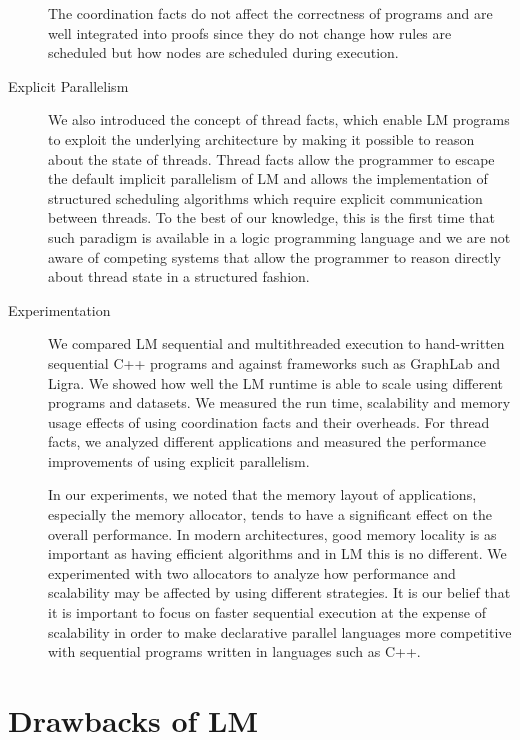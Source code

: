 \begin{description}
The coordination facts do not affect the correctness of programs and are well
integrated into proofs since they do not change how rules are scheduled but how
nodes are scheduled during execution.

\item[Explicit Parallelism]

We also introduced the concept of thread facts, which enable LM programs to
exploit the underlying architecture by making it possible to reason about the
state of threads. Thread facts allow the programmer to escape the default
implicit parallelism of LM and allows the implementation of structured
scheduling algorithms which require explicit communication between threads.
To the best of our knowledge, this is the first time that such paradigm
is available in a logic programming language and we are not aware of competing
systems that allow the programmer to reason directly about thread state in a
structured fashion.

\item[Experimentation]

We compared LM sequential and multithreaded execution to hand-written sequential
C++ programs and against frameworks such as GraphLab and Ligra. We showed how
well the LM runtime is able to scale using different programs and datasets. We
measured the run time, scalability and memory usage effects of using
coordination facts and their overheads. For thread facts, we analyzed different
applications and measured the performance improvements of using explicit
parallelism.

In our experiments, we noted that the memory layout of applications, especially
the memory allocator, tends to have a significant effect on the overall
performance. In modern architectures, good memory locality is as important as
having efficient algorithms and in LM this is no different.
We experimented with two allocators to analyze how
performance and scalability may be affected by using different strategies. It is
our belief that it is important to focus on faster sequential execution at the
expense of scalability in order to make declarative parallel languages more
competitive with sequential programs written in languages such as C++.

\end{description}

\section{Drawbacks of LM}


